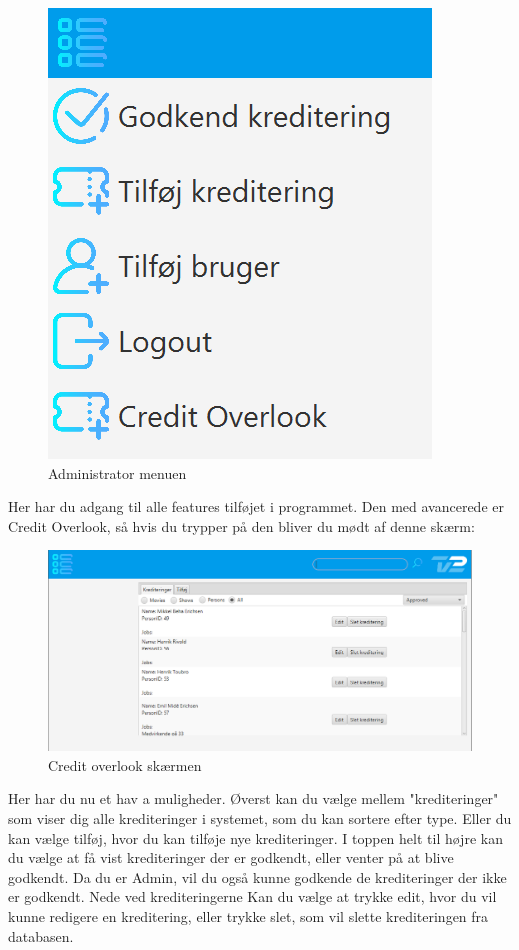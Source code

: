 \begin{figure}[H]
    \centering
    \includegraphics[scale = 0.8]{images/AdminMenu.PNG}
    \caption{Administrator menuen}
    \label{fig:my_label}
\end{figure}

Her har du adgang til alle features tilføjet i programmet. Den med avancerede er Credit Overlook, så hvis du trypper på den bliver du mødt af denne skærm:

\begin{figure}[H]
    \centering
    \includegraphics[scale = 0.65]{images/CreditOverlook.PNG}
    \caption{Credit overlook skærmen}
    \label{fig:my_label}
\end{figure}

Her har du nu et hav a muligheder. Øverst kan du vælge mellem "krediteringer" som viser dig alle krediteringer i systemet, som du kan sortere efter type. Eller du kan vælge tilføj, hvor du kan tilføje nye krediteringer. I toppen helt til højre kan du vælge at få vist krediteringer der er godkendt, eller venter på at blive godkendt. Da du er Admin, vil du også kunne godkende de krediteringer der ikke er godkendt. Nede ved krediteringerne Kan du vælge at trykke edit, hvor du vil kunne redigere en kreditering, eller trykke slet, som vil slette krediteringen fra databasen.